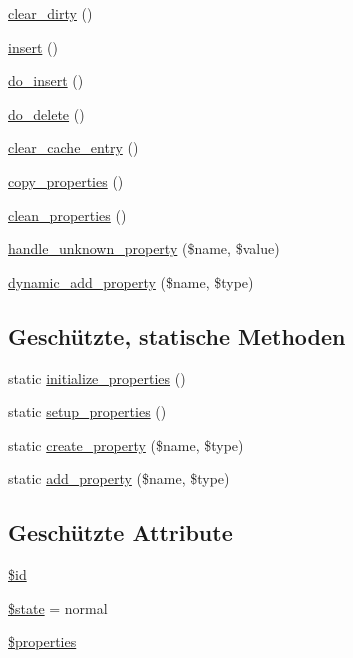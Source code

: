 \begin{DoxyCompactItemize}
\item 
\hyperlink{classSunhill_1_1propertieshaving_ae628ab7af5b76ebf8169a8c9fa36fd30}{clear\+\_\+dirty} ()
\item 
\hyperlink{classSunhill_1_1propertieshaving_ad238ce17c19c0e85bbbd3d42f6f28416}{insert} ()
\item 
\hyperlink{classSunhill_1_1propertieshaving_a00ffd21a23afde683e506edad68f69ea}{do\+\_\+insert} ()
\item 
\hyperlink{classSunhill_1_1propertieshaving_a9ee342a0440a18e193013ab0816ec2cd}{do\+\_\+delete} ()
\item 
\hyperlink{classSunhill_1_1propertieshaving_ad75957d2960f2ae035a3e4ba9035fcf4}{clear\+\_\+cache\+\_\+entry} ()
\item 
\hyperlink{classSunhill_1_1propertieshaving_aa525c048dd91d30f372fc59dca0aa6b9}{copy\+\_\+properties} ()
\item 
\hyperlink{classSunhill_1_1propertieshaving_a8753e8079e723857e6153fd89fe07089}{clean\+\_\+properties} ()
\item 
\hyperlink{classSunhill_1_1propertieshaving_a358a4c849814fa0441e4ec00d30814a9}{handle\+\_\+unknown\+\_\+property} (\$name, \$value)
\item 
\hyperlink{classSunhill_1_1propertieshaving_a814168ccb39ee8d6e575a281a7851c05}{dynamic\+\_\+add\+\_\+property} (\$name, \$type)
\end{DoxyCompactItemize}
\subsection*{Geschützte, statische Methoden}
\begin{DoxyCompactItemize}
\item 
static \hyperlink{classSunhill_1_1propertieshaving_a871ad9d06732e6a6562c1d79b4c38b5d}{initialize\+\_\+properties} ()
\item 
static \hyperlink{classSunhill_1_1propertieshaving_add1f5256b31a55fefb5ed21474e95e87}{setup\+\_\+properties} ()
\item 
static \hyperlink{classSunhill_1_1propertieshaving_a1bdaea4752496e11e2b90bd2ec63c85a}{create\+\_\+property} (\$name, \$type)
\item 
static \hyperlink{classSunhill_1_1propertieshaving_ab2c93a9a349792f8492862ae06d88108}{add\+\_\+property} (\$name, \$type)
\end{DoxyCompactItemize}
\subsection*{Geschützte Attribute}
\begin{DoxyCompactItemize}
\item 
\hyperlink{classSunhill_1_1propertieshaving_a6071c544649d81ee67aba7a13a3106f7}{\$id}
\item 
\hyperlink{classSunhill_1_1propertieshaving_a9065fb5a6808652ded02d543d4371698}{\$state} = \textquotesingle{}normal\textquotesingle{}
\item 
\hyperlink{classSunhill_1_1propertieshaving_a59d18ef597a3a66776eb860edb80be72}{\$properties}
\end{DoxyCompactItemize}
